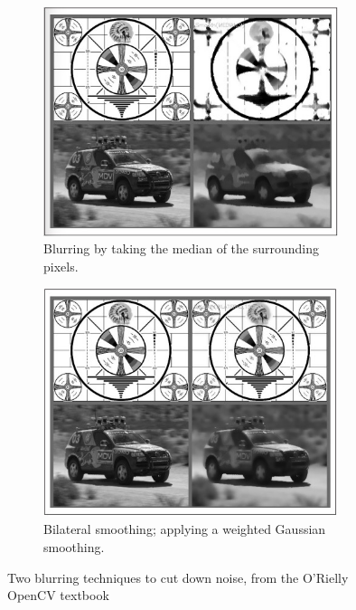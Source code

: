 \begin{figure}
\centering
\begin{subfigure}{0.4\textwidth}
 \centering
 \includegraphics[width=0.95\textwidth]{"./image/median_blurring"}
 \caption{Blurring by taking the median of the surrounding pixels.}
 \label{fig:blurring:sub1}
\end{subfigure}
\begin{subfigure}{0.4\textwidth}
 \centering
 \includegraphics[width=0.95\textwidth]{"./image/bilateral_smoothing"}
 \caption{Bilateral smoothing; applying a weighted Gaussian smoothing.}
 \label{fig:blurring:sub2}
\end{subfigure}
\caption{Two blurring techniques to cut down noise, from the O'Rielly OpenCV textbook}
\label{fig:blurring}
\end{figure}

